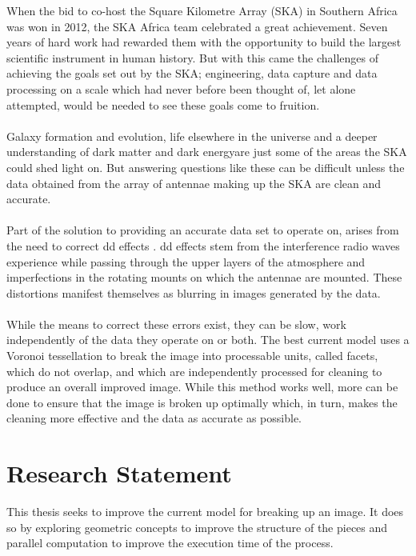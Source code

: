 When the bid to co-host the Square Kilometre Array (SKA) in Southern Africa was won in 2012, the SKA Africa team celebrated a great achievement. Seven years of hard work had rewarded them with the opportunity to build the largest scientific instrument in human history. But with this came the challenges of achieving the goals set out by the SKA; engineering, data capture and data processing on a scale which had never before been thought of, let alone attempted, would be needed to see these goals come to fruition.
\\
\\
Galaxy formation and evolution, life elsewhere in the universe and a deeper understanding of dark matter and dark energy\footnotemark are just some of the areas the SKA could shed light on. But answering questions like these can be difficult unless the data obtained from the array of antennae making up the SKA are clean and accurate.
\\
\\
Part of the solution to providing an accurate data set to operate on, arises from the need to correct \gls{dd} effects \citep{smirnov2011revisiting}. \gls{dd} effects stem from the interference radio waves experience while passing through the upper layers of the atmosphere and imperfections in the rotating mounts on which the antennae are mounted. These distortions manifest themselves as blurring in images generated by the data.
\\
\\
While the means to correct these errors exist, they can be slow, work independently of the data they operate on or both. The best current model uses a Voronoi tessellation \citep{okabe2009spatial} to break the image into processable units, called facets, which do not overlap, and which are independently processed for cleaning to produce an overall improved image. While this method works well, more can be done to ensure that the image is broken up optimally which, in turn, makes the cleaning more effective and the data as accurate as possible.
\section{Research Statement}
This thesis seeks to improve the current model for breaking up an image. It does so by exploring geometric concepts to improve the structure of the pieces and parallel computation to improve the execution time of the process.
